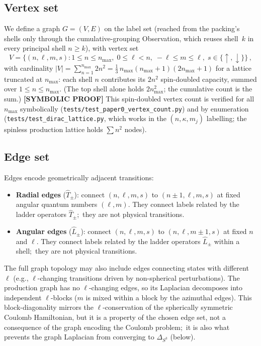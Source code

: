 \documentclass[aps,prl,reprint,amsmath,amssymb]{revtex4-2}
\begin{document}
\subsection{Vertex set}

We define a graph $G = (V, E)$ on the label set (reached from the
packing's shells only through the cumulative-grouping Observation,
which reuses shell~$k$ in every principal shell $n \geq k$), with vertex set
\begin{equation}
  V = \bigl\{(n, \ell, m, s) : 1 \leq n \leq n_{\max},\;
      0 \leq \ell < n,\;
      -\ell \leq m \leq \ell,\;
      s \in \{\uparrow, \downarrow\}\bigr\} \,,
  \label{eq:vertex-set}
\end{equation}
with cardinality
$|V| = \sum_{n=1}^{n_{\max}} 2n^2
     = \tfrac{1}{3}\,n_{\max}(n_{\max}+1)(2n_{\max}+1)$
for a lattice truncated at $n_{\max}$: each shell $n$ contributes its
$2n^2$ spin-doubled capacity, summed over $1 \le n \le n_{\max}$. (The
top shell alone holds $2n_{\max}^2$; the cumulative count is the sum.)
\textbf{[SYMBOLIC PROOF]} This spin-doubled vertex count is verified for
all $n_{\max}$ symbolically (\texttt{tests/test\_paper0\_vertex\_count.py})
and by enumeration (\texttt{tests/test\_dirac\_lattice.py}, which works
in the $(n, \kappa, m_j)$ labelling; the spinless production lattice
holds $\sum n^2$ nodes).

\subsection{Edge set}

Edges encode geometrically adjacent transitions:
\begin{itemize}
\item \textbf{Radial edges} ($\hat{T}_{\pm}$): connect
  $(n, \ell, m, s)$ to $(n \pm 1, \ell, m, s)$ at fixed angular
  quantum numbers $(\ell, m)$.  They connect labels related by the
  ladder operators $\hat{T}_{\pm}$;\ they are not physical transitions.

\item \textbf{Angular edges} ($\hat{L}_{\pm}$): connect
  $(n, \ell, m, s)$ to $(n, \ell, m \pm 1, s)$ at fixed $n$ and
  $\ell$.  They connect labels related by the ladder operators
  $\hat{L}_{\pm}$ within a shell;\ they are not physical transitions.
\end{itemize}

The full graph topology may also include edges connecting states with
different~$\ell$ (e.g., $\ell$-changing transitions driven by
non-spherical perturbations).  The production graph has no
$\ell$-changing edges, so its Laplacian decomposes into independent
$\ell$-blocks ($m$ is mixed within a block by the azimuthal edges).  This
block-diagonality mirrors the $\ell$-conservation of the spherically
symmetric Coulomb Hamiltonian, but it is a property of the chosen edge
set, not a consequence of the graph encoding the Coulomb problem;\ it
is also what prevents the graph Laplacian from converging to
$\Delta_{S^3}$ (below).
\end{document}
